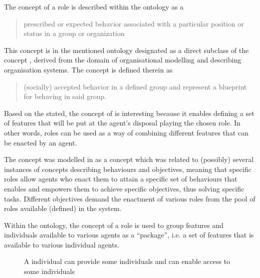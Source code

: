  The concept of a role is described within the  ontology as a \blockquote{prescribed or expected behavior associated with a particular position or status in a group or organization}. This concept is in the mentioned ontology designated as a direct subclass of the concept , derived from the domain of organisational modelling and describing organisation systems. The  concept is defined therein as \blockquote{(socially) accepted behavior in a defined group and  represent a blueprint for behaving in said group.} Based on the stated, the concept of  is interesting because it enables defining a set of features that will be put at the agent's disposal playing the chosen role. In other words, roles can be used as a way of combining different features that can be enacted by an agent. 

The  concept was modelled in \cite{okresaduric2019OrganizationalModelingLargeScale} as a concept which was related to (possibly) several instances of concepts describing behaviours and objectives, meaning that specific roles allow agents who enact them to attain a specific set of behaviours
that enables and empowers them to achieve specific objectives, thus solving specific tasks. Different objectives demand the enactment of various roles from the pool of roles available (defined) in the system. 

Within the \magoontologyname ontology,
%
the concept of a role is used to group features and individuals available to various agents as a \enquote{package}, i.e. a set of features that is available to various individual agents. 

\begin{figure}
    \centering
    
    \caption{A  individual can provide some  individuals and can enable access to some  individuals}
    \label{fig: roles achieve objectives and enable knowledge}
\end{figure}

